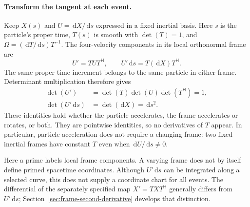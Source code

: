 \documentclass[11pt]{article}
\newcommand{\pv}[1]{{#1}}
\newcommand{\pvGreek}[1]{{#1}}
\newcommand{\pT}{\pv{T}}
\newcommand{\pU}{\pv{U}}
\newcommand{\pX}{\pv{X}}
\newcommand{\pvOmega}{\pvGreek{\Omega}}
\numberwithin{equation}{section}
\newcommand{\dd}{\,\mathrm d}
\begin{document}
\paragraph{Transform the tangent at each event.}
Keep $\pX(s)$ and $\pU=\dd\pX/\dd s$ expressed in a fixed inertial
basis. Here $s$ is the particle's proper time,
$\pT(s)$ is smooth with $\det(\pT)=1$, and
$\pvOmega=(\dd\pT/\dd s)\pT^{-1}$.
The four-velocity components in its local orthonormal frame are
\[
 \pU'=\pT\pU\pT^{\mathsf H},\qquad
 \pU'\dd s=\pT(\dd\pX)\pT^{\mathsf H}.
\]
The same proper-time increment belongs to the same particle in
either frame. Determinant multiplication therefore gives
\begin{equation}
 \boxed{\begin{aligned}
 \det(\pU')&=\det(\pT)\det(\pU)\det(\pT^{\mathsf H})=1,\\
 \det(\pU'\dd s)&=\det(\dd\pX)=\dd s^2.
 \end{aligned}}
 \label{eq:local-velocity-normalization}
\end{equation}
These identities hold whether the particle accelerates, the frame
accelerates or rotates, or both. They are pointwise identities, so
no derivatives of $\pT$ appear. In particular, particle acceleration
does not require a changing frame: two fixed inertial frames have
constant $\pT$ even when $\dd\pU/\dd s\ne0$.

Here a prime labels local frame components. A varying frame does
not by itself define primed spacetime coordinates. Although
$\pU'\dd s$ can be integrated along a selected curve, this does
not supply a coordinate chart for all events.
The differential of the separately specified map
$\pX'=\pT\pX\pT^{\mathsf H}$ generally differs from
$\pU'\dd s$; Section~\ref{sec:frame-second-derivative} develops
that distinction.
\end{document}
